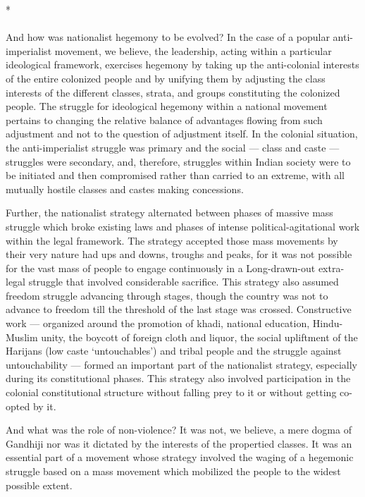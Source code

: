 \begin{multicols}{2}
\begin{center}*\end{center}

\paragraph*{}
And how was nationalist hegemony to be evolved? In the case of a popular anti-imperialist movement, we believe, the leadership, acting within a particular ideological framework, exercises hegemony by taking up the anti-colonial interests of the entire colonized people and by unifying them by adjusting the class interests of the different classes, strata, and groups constituting the colonized people. The struggle for ideological hegemony within a national movement pertains to changing the relative balance of advantages flowing from such adjustment and not to the question of adjustment itself. In the colonial situation, the anti-imperialist struggle was primary and the social --- class and caste --- struggles were secondary, and, therefore, struggles within Indian society were to be initiated and then compromised rather than carried to an extreme, with all mutually hostile classes and castes making concessions.

Further, the nationalist strategy alternated between phases of massive mass struggle which broke existing laws and phases of intense political-agitational work within the legal framework. The strategy accepted those mass movements by their very nature had ups and downs, troughs and peaks, for it was not possible for the vast mass of people to engage continuously in a Long-drawn-out extra-legal struggle that involved considerable sacrifice. This strategy also assumed freedom struggle advancing through stages, though the country was not to advance to freedom till the threshold of the last stage was crossed. Constructive work --- organized around the promotion of khadi, national education, Hindu-Muslim unity, the boycott of foreign cloth and liquor, the social upliftment of the Harijans (low caste `untouchables') and tribal people and the struggle against untouchability --- formed an important part of the nationalist strategy, especially during its constitutional phases. This strategy also involved participation in the colonial constitutional structure without falling prey to it or without getting co-opted by it.

And what was the role of non-violence? It was not, we believe, a mere dogma of Gandhiji nor was it dictated by the interests of the propertied classes. It was an essential part of a movement whose strategy involved the waging of a hegemonic struggle based on a mass movement which mobilized the people to the widest possible extent.


\end{multicols}
